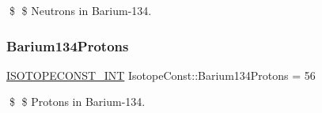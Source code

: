 \$ \$ Neutrons in Barium-\/134. \mbox{\label{group___isotope_const-_barium-_ba134_ga30b11d7d5ee7dbe565a6db183de3349c}} 
\subsubsection{\texorpdfstring{Barium134\+Protons}{Barium134Protons}}
{\footnotesize\ttfamily \mbox{\hyperlink{group___isotope_const-_macros_ga5f18360b3e99483a35c32d789e62621c}{I\+S\+O\+T\+O\+P\+E\+C\+O\+N\+S\+T\+\_\+\+I\+NT}} Isotope\+Const\+::\+Barium134\+Protons = 56}

\$ \$ Protons in Barium-\/134. 
